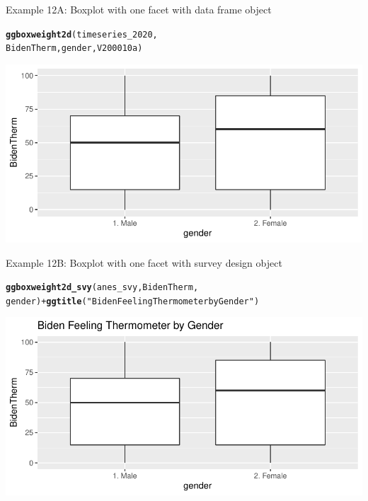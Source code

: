 \documentclass{beamer}\usepackage[]{graphicx}\usepackage[]{xcolor}
\makeatletter
\newcommand{\hlstr}[1]{\textcolor[rgb]{0.192,0.494,0.8}{#1}}%
\newcommand{\hlopt}[1]{\textcolor[rgb]{0,0,0}{#1}}%
\newcommand{\hlstd}[1]{\textcolor[rgb]{0.345,0.345,0.345}{#1}}%
\newcommand{\hlkwd}[1]{\textcolor[rgb]{0.737,0.353,0.396}{\textbf{#1}}}%
\newenvironment{kframe}{%
 \def\at@end@of@kframe{}%
 \ifinner\ifhmode%
  \def\at@end@of@kframe{\end{minipage}}%
  \begin{minipage}{\columnwidth}%
 \fi\fi%
 \def\FrameCommand##1{\hskip\@totalleftmargin \hskip-\fboxsep
 \colorbox{shadecolor}{##1}\hskip-\fboxsep
     \hskip-\linewidth \hskip-\@totalleftmargin \hskip\columnwidth}%
 \MakeFramed {\advance\hsize-\width
   \@totalleftmargin\z@ \linewidth\hsize
   \@setminipage}}%
 {\par\unskip\endMakeFramed%
 \at@end@of@kframe}
\newenvironment{knitrout}{}{} %
\makeatother
\begin{document}
\begin{frame}[fragile]{Example 12A: Boxplot with one facet with data frame object}
\begin{knitrout}
\color{fgcolor}\begin{kframe}
\begin{alltt}
\hlkwd{ggboxweight2d}\hlstd{(timeseries_2020,}
    \hlstd{BidenTherm, gender, V200010a)}
\end{alltt}
\end{kframe}
\includegraphics[width=0.95\linewidth]{figure/unnamed-chunk-66-1} 
\end{knitrout}
\end{frame}

\begin{frame}[fragile]{Example 12B: Boxplot with one facet with survey design object}
\begin{knitrout}
\color{fgcolor}\begin{kframe}
\begin{alltt}
\hlkwd{ggboxweight2d_svy}\hlstd{(anes_svy, BidenTherm,}
    \hlstd{gender)} \hlopt{+} \hlkwd{ggtitle}\hlstd{(}\hlstr{"Biden Feeling Thermometer by Gender"}\hlstd{)}
\end{alltt}
\end{kframe}
\includegraphics[width=0.95\linewidth]{figure/unnamed-chunk-67-1} 
\end{knitrout}

\end{frame}
\end{document}
